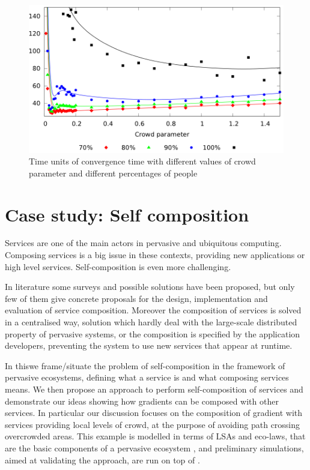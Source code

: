 \documentclass[12pt,a4paper,twoside,openright]{book}
\begin{document}
\begin{figure}
\begin{center}
   \includegraphics[width=0.99\columnwidth]{img/jos-graph}
   \vspace{-10pt}\caption[Crowd parameter]{Time units of convergence time with different values of crowd parameter and different percentages of people}\label{img:jos-graph}\vspace{-10pt}
\end{center}
\end{figure}


\chapter{Case study: Self composition}

Services are one of the main actors in pervasive and ubiquitous computing. 
%
Composing services is a big issue in these contexts, providing new applications or high level services.
%
Self-composition is even more challenging.

In literature some surveys and possible solutions have been proposed, but only few of them give concrete proposals for the design, implementation and evaluation of service composition.
%
Moreover the composition of services is solved in a centralised way, solution which hardly deal with the large-scale distributed property of pervasive systems, or the composition is specified by the application developers, preventing the system to use new services that appear at runtime.

In this\levelText{}we frame/situate the problem of self-composition in the framework of pervasive ecosystems, defining what a service is and what composing services means. 
%
We then propose an approach to perform self-composition of services and demonstrate our ideas showing how gradients can be composed with other services. 
%
In particular our discussion focuses on the composition of gradient with services providing local levels of crowd, at the purpose of avoiding path crossing overcrowded areas.
%
This example is modelled in terms of LSAs and eco-laws, that are the basic components of a pervasive ecosystem \cite{sapereecolaws-sac2012}, and preliminary simulations, aimed at validating the approach, are run on top of \alchemist{}.
\end{document}
